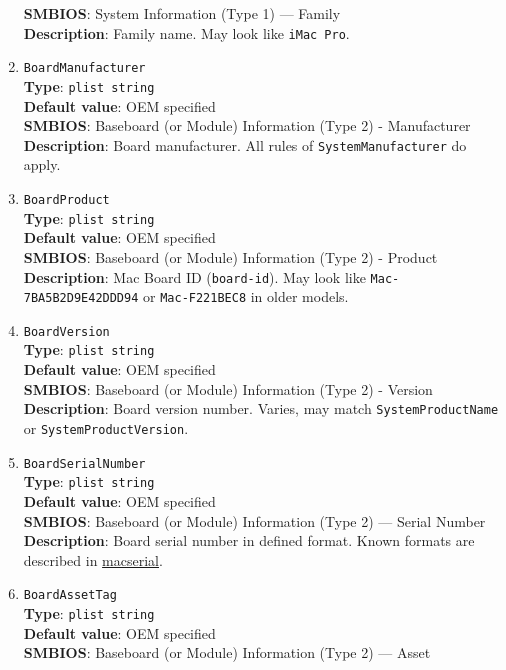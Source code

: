 \documentclass[]{article}
\begin{document}
\begin{enumerate}
  \textbf{SMBIOS}: System Information (Type 1) --- Family\\
  \textbf{Description}: Family name. May look like \texttt{iMac\ Pro}.
\item
  \texttt{BoardManufacturer}\\
  \textbf{Type}: \texttt{plist\ string}\\
  \textbf{Default value}: OEM specified\\
  \textbf{SMBIOS}: Baseboard (or Module) Information (Type 2) -
  Manufacturer\\
  \textbf{Description}: Board manufacturer. All rules of
  \texttt{SystemManufacturer} do apply.
\item
  \texttt{BoardProduct}\\
  \textbf{Type}: \texttt{plist\ string}\\
  \textbf{Default value}: OEM specified\\
  \textbf{SMBIOS}: Baseboard (or Module) Information (Type 2) -
  Product\\
  \textbf{Description}: Mac Board ID (\texttt{board-id}). May look like
  \texttt{Mac-7BA5B2D9E42DDD94} or \texttt{Mac-F221BEC8} in older
  models.
\item
  \texttt{BoardVersion}\\
  \textbf{Type}: \texttt{plist\ string}\\
  \textbf{Default value}: OEM specified\\
  \textbf{SMBIOS}: Baseboard (or Module) Information (Type 2) -
  Version\\
  \textbf{Description}: Board version number. Varies, may match
  \texttt{SystemProductName} or \texttt{SystemProductVersion}.
\item
  \texttt{BoardSerialNumber}\\
  \textbf{Type}: \texttt{plist\ string}\\
  \textbf{Default value}: OEM specified\\
  \textbf{SMBIOS}: Baseboard (or Module) Information (Type 2) --- Serial
  Number\\
  \textbf{Description}: Board serial number in defined format. Known
  formats are described in
  \href{https://github.com/acidanthera/macserial/blob/master/FORMAT.md}{macserial}.
\item
  \texttt{BoardAssetTag}\\
  \textbf{Type}: \texttt{plist\ string}\\
  \textbf{Default value}: OEM specified\\
  \textbf{SMBIOS}: Baseboard (or Module) Information (Type 2) --- Asset

\end{enumerate}
\end{document}
